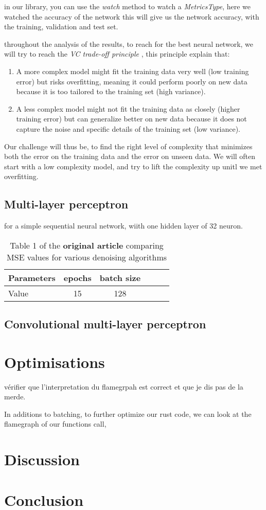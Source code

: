 \documentclass[a4paper, twocolumn, twoside]{article}
\begin{document}
	in our library, you can use the \textit{watch} method to watch a \textit{MetricsType}, here we watched the accuracy of the network
	this will give us the network accuracy, with the training, validation and test set.

	throughout the analysis of the results, to reach for the best neural network, we will try to reach the \textit{VC trade-off principle} \cite{LeCun2019} \cite{vapnik1974theory},
	this principle explain that:

	\begin{enumerate}
		\item A more complex model might fit the training data very well (low training error) but risks overfitting, meaning it could perform poorly on new data because it is too tailored to the training set (high variance).
		\item A less complex model might not fit the training data as closely (higher training error) but can generalize better on new data because it does not capture the noise and specific details of the training set (low variance).
	\end{enumerate}

	Our challenge will thus be, to find the right level of complexity that minimizes both the error on the training data and the error on unseen data.
	We will often start with a low complexity model, and try to lift the complexity up unitl we met overfitting.

	\subsection{Multi-layer perceptron}

	for a simple sequential neural network, wiith one hidden layer of 32 neuron.


	\begin{table}[H]
	\centering
	\begin{tabular}{|l|c|c|c|c|c|}
	\hline
	Parameters & epochs & batch size  \\
	\hline
	Value & 15 & 128   \\
	\hline
	\end{tabular}
	\caption{Table 1 of the \textbf{original article} comparing MSE values for various denoising algorithms}
	\end{table}

	\subsection{Convolutional multi-layer perceptron}

	\section{Optimisations}
	vérifier que l'interpretation du flamegrpah est correct et que je dis pas de la merde.

	In additions to batching, to further optimize our rust code, we can look at the flamegraph of our functions call, 

	\section{Discussion}

	\section{Conclusion}

	\printbibliography
\end{document}
